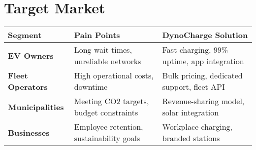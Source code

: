 
\section {Target Market}

\begin{tabular}{|l|l|l|}
\hline
\textbf{Segment} & \textbf{Pain Points} & \textbf{DynoCharge Solution} \\
\hline
\textbf{EV Owners} & Long wait times, unreliable networks & Fast charging, 99\% uptime, app integration \\
\hline
\textbf{Fleet Operators} & High operational costs, downtime & Bulk pricing, dedicated support, fleet API \\
\hline
\textbf{Municipalities} & Meeting CO2 targets, budget constraints & Revenue-sharing model, solar integration \\
\hline
\textbf{Businesses} & Employee retention, sustainability goals & Workplace charging, branded stations \\
\hline
\end{tabular}



